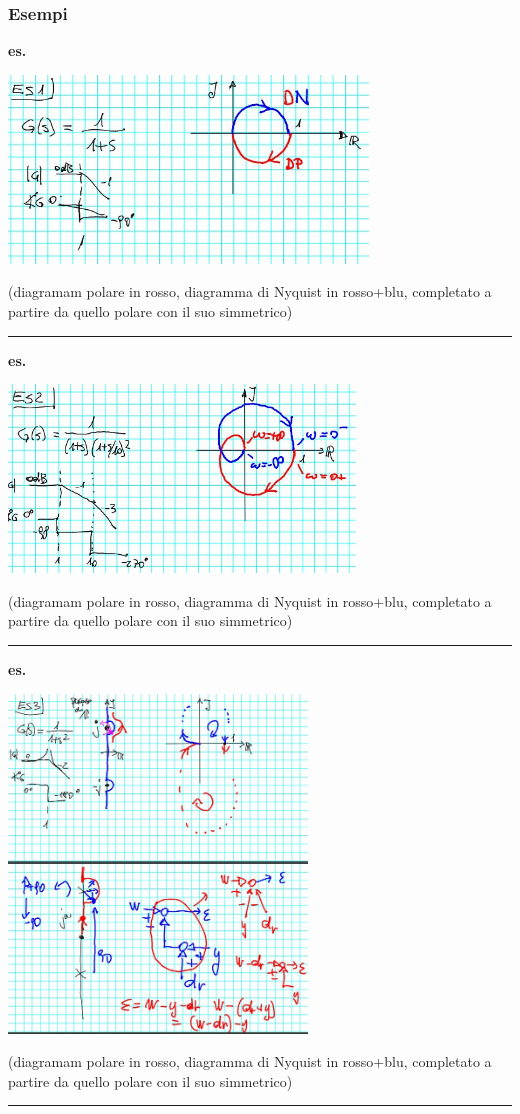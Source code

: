 \subsubsection{Esempi}
\textbf{es.} 
\begin{center}
    \includegraphics[height=5cm]{../lezione18/img8.JPG}
\end{center}
(diagramam polare in rosso, diagramma di Nyquist in rosso+blu, completato a partire da quello polare con il suo simmetrico)\newline
\rule{\textwidth}{0,4pt}
\textbf{es.} 
\begin{center}
    \includegraphics[height=5cm]{../lezione18/img9.JPG}
\end{center}
(diagramam polare in rosso, diagramma di Nyquist in rosso+blu, completato a partire da quello polare con il suo simmetrico)\newline
\rule{\textwidth}{0,4pt}
\textbf{es.} 
\begin{center}
    \includegraphics[height=9cm]{../lezione18/img10.JPG}
\end{center}
(diagramam polare in rosso, diagramma di Nyquist in rosso+blu, completato a partire da quello polare con il suo simmetrico)\newline
\rule{\textwidth}{0,4pt}
